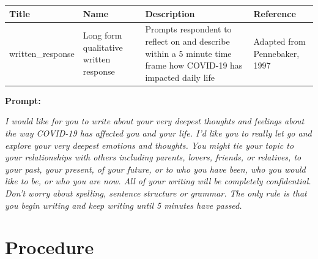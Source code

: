 \documentclass[]{book}
\begin{document}
\begin{longtable}[]{@{}llll@{}}
\toprule
\begin{minipage}[b]{0.22\columnwidth}\raggedright
Title\strut
\end{minipage} & \begin{minipage}[b]{0.27\columnwidth}\raggedright
Name\strut
\end{minipage} & \begin{minipage}[b]{0.22\columnwidth}\raggedright
Description\strut
\end{minipage} & \begin{minipage}[b]{0.18\columnwidth}\raggedright
Reference\strut
\end{minipage}\tabularnewline
\midrule
\endhead
\begin{minipage}[t]{0.22\columnwidth}\raggedright
written\_response\strut
\end{minipage} & \begin{minipage}[t]{0.27\columnwidth}\raggedright
Long form qualitative written response\strut
\end{minipage} & \begin{minipage}[t]{0.22\columnwidth}\raggedright
Prompts respondent to reflect on and describe within a 5 minute time frame how COVID-19 has impacted daily life\strut
\end{minipage} & \begin{minipage}[t]{0.18\columnwidth}\raggedright
Adapted from Pennebaker, 1997\strut
\end{minipage}\tabularnewline
\bottomrule
\end{longtable}

\textbf{Prompt:}

\emph{I would like for you to write about your very deepest thoughts and feelings about the way COVID-19 has affected you and your life. I'd like you to really let go and explore your very deepest emotions and thoughts. You might tie your topic to your relationships with others including parents, lovers, friends, or relatives, to your past, your present, of your future, or to who you have been, who you would like to be, or who you are now. All of your writing will be completely confidential. Don't worry about spelling, sentence structure or grammar. The only rule is that you begin writing and keep writing until 5 minutes have passed.}

\hypertarget{procedure}{%
\section{Procedure}\label{procedure}}
\end{document}
